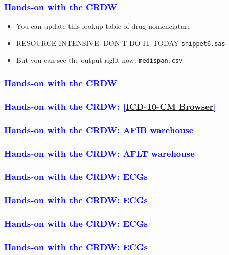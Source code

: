 \documentclass[11pt,pdftex,dvipsnames,usenames]{beamer}
\begin{document}
\begin{frame}[fragile]\frametitle{\bf\textcolor{blue}{Hands-on with the CRDW}}
\begin{itemize}
\item You can update this lookup table of drug nomenclature\\ 
\item RESOURCE INTENSIVE: DON'T DO IT TODAY \texttt{snippet6.sas}
\item But you can see the output right now: \texttt{medispan.csv}
\end{itemize}
\end{frame}


\begin{frame}[fragile]\frametitle{\bf\textcolor{blue}{Hands-on with the CRDW}}

\end{frame}


\begin{frame}[fragile]\frametitle{\bf\textcolor{blue}{Hands-on with the CRDW: 
\textcolor{PineGreen}{[\href{https://icd10cmtool.cdc.gov}
{ICD-10-CM Browser}]}}}

\end{frame}


\begin{frame}[fragile]\frametitle{\bf\textcolor{blue}{Hands-on with the CRDW: AFIB warehouse}}

\end{frame}


\begin{frame}[fragile]\frametitle{\bf\textcolor{blue}{Hands-on with the CRDW: AFLT warehouse}}

\end{frame}


\begin{frame}[fragile]\frametitle{\bf\textcolor{blue}{Hands-on with the CRDW: ECGs}}

\end{frame}


\begin{frame}[fragile]\frametitle{\bf\textcolor{blue}{Hands-on with the CRDW: ECGs}}

\end{frame}


\begin{frame}[fragile]\frametitle{\bf\textcolor{blue}{Hands-on with the CRDW: ECGs}}

\end{frame}


\begin{frame}[fragile]\frametitle{\bf\textcolor{blue}{Hands-on with the CRDW: ECGs}}

\end{frame}
\end{document}
